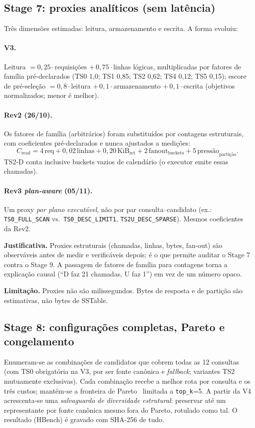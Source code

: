 \documentclass[11pt,a4paper]{article}
\newcommand{\caixa}[2][boxbg]{\par\smallskip\noindent\colorbox{#1}{\parbox{\dimexpr\linewidth-2\fboxsep}{#2}}\par\smallskip}
\newcommand{\just}[1]{\caixa{\textbf{Justificativa.} #1}}
\newcommand{\limit}[1]{\caixa[warnbg]{\textbf{Limitação.} #1}}
\begin{document}
\subsection{Stage 7: proxies analíticos (sem latência)}
Três dimensões estimadas: leitura, armazenamento e escrita. A forma evoluiu:

\paragraph{V3.} Leitura $=0{,}25\cdot$requisições $+\,0{,}75\cdot$linhas lógicas, multiplicadas por fatores de família pré-declarados (TS0 1,0; TS1 0,85; TS2 0,62; TS4 0,12; TS5 0,15); escore de pré-seleção $=0{,}8\cdot$leitura $+\,0{,}1\cdot$armazenamento $+\,0{,}1\cdot$escrita (objetivos normalizados; menor é melhor).

\paragraph{Rev2 (26/10).} Os fatores de família (arbitrários) foram substituídos por contagens estruturais, com coeficientes pré-declarados e nunca ajustados a medições:
\[
C_{\text{read}} = 4\,\text{req} + 0{,}02\,\text{linhas} + 0{,}20\,\text{KiB}_{\text{ret}} + 2\,\text{fanout}_{\text{buckets}} + 5\,\text{pressão}_{\text{partição}}.
\]
TS2-D conta inclusive buckets vazios de calendário (o executor emite essas chamadas).

\paragraph{Rev3 \emph{plan-aware} (05/11).} Um proxy \emph{por plano executável}, não por par consulta--candidato (ex.: \texttt{TS0\_FULL\_SCAN} vs.\ \texttt{TS0\_DESC\_LIMIT1}, \texttt{TS2U\_DESC\_SPARSE}). Mesmos coeficientes da Rev2.

\just{Proxies estruturais (chamadas, linhas, bytes, fan-out) são observáveis antes de medir e verificáveis depois; é o que permite auditar o Stage 7 contra o Stage 9. A passagem de fatores de família para contagens torna a explicação causal (``D faz 21 chamadas, U faz 1'') em vez de um número opaco.}
\limit{Proxies não são milissegundos. Bytes de resposta e de partição são estimativas, não bytes de SSTable.}

\subsection{Stage 8: configurações completas, Pareto e congelamento}
Enumeram-se as combinações de candidatos que cobrem todas as 12 consultas (com TS0 obrigatória na V3, por ser fonte canônica e \emph{fallback}; variantes TS2 mutuamente exclusivas). Cada combinação recebe a melhor rota por consulta e os três custos; mantém-se a fronteira de Pareto~\cite{ehrgott} limitada a \texttt{top\_k}=5. A partir da V4 acrescenta-se uma \emph{salvaguarda de diversidade estrutural}: preservar até um representante por fonte canônica mesmo fora do Pareto, rotulado como tal. O resultado (HBench) é gravado com SHA-256 de tudo.
\end{document}

